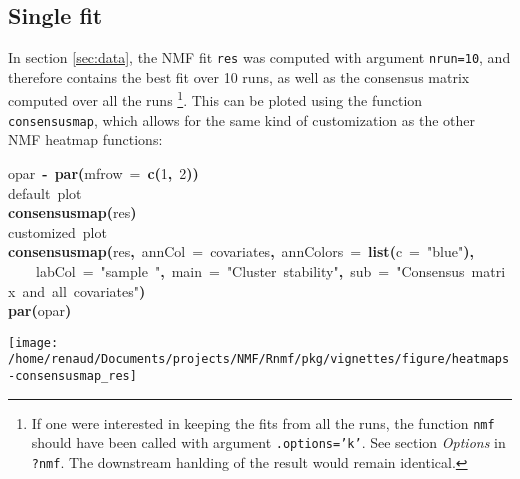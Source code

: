 \documentclass[a4paper]{article}\usepackage{graphicx, color}
\makeatletter
\def\maxwidth{ %
  \ifdim\Gin@nat@width>\linewidth
    \linewidth
  \else
    \Gin@nat@width
  \fi
}
\newcommand{\hlnumber}[1]{\textcolor[rgb]{0,0,0}{#1}}%
\newcommand{\hlfunctioncall}[1]{\textcolor[rgb]{0.501960784313725,0,0.329411764705882}{\textbf{#1}}}%
\newcommand{\hlstring}[1]{\textcolor[rgb]{0.6,0.6,1}{#1}}%
\newcommand{\hlkeyword}[1]{\textcolor[rgb]{0,0,0}{\textbf{#1}}}%
\newcommand{\hlargument}[1]{\textcolor[rgb]{0.690196078431373,0.250980392156863,0.0196078431372549}{#1}}%
\newcommand{\hlcomment}[1]{\textcolor[rgb]{0.180392156862745,0.6,0.341176470588235}{#1}}%
\newcommand{\hlassignement}[1]{\textcolor[rgb]{0,0,0}{\textbf{#1}}}%
\newcommand{\hlsymbol}[1]{\textcolor[rgb]{0,0,0}{#1}}%
\newcommand{\hlstd}[1]{\textcolor[rgb]{0,0,0}{#1}}%
\newenvironment{kframe}{%
 \def\FrameCommand##1{\hskip\@totalleftmargin \hskip-\fboxsep
 \colorbox{shadecolor}{##1}\hskip-\fboxsep
     \hskip-\linewidth \hskip-\@totalleftmargin \hskip\columnwidth}%
 \MakeFramed {\advance\hsize-\width
   \@totalleftmargin\z@ \linewidth\hsize
   \@setminipage}}%
 {\par\unskip\endMakeFramed}
\newenvironment{knitrout}{}{} %
\let\code=\texttt
\makeatother
\begin{document}
\subsection{Single fit}
In section \cref{sec:data}, the NMF fit \code{res} was computed with argument 
\code{nrun=10}, and therefore contains the best fit over 10 runs, as well as 
the consensus matrix computed over all the runs
\footnote{If one were interested in keeping the fits from all the runs, the 
function \code{nmf} should have been called with argument \code{.options='k'}.
See section \emph{Options} in \code{?nmf}.
The downstream hanlding of the result would remain identical.}.
This can be ploted using the function \code{consensusmap}, which allows for the 
same kind of customization as the other NMF heatmap functions:

\begin{knitrout}
\color{fgcolor}\begin{kframe}
\begin{flushleft}
\ttfamily\noindent
\hlsymbol{opar}{\ }\hlassignement{\usebox{\hlnormalsizeboxlessthan}-}{\ }\hlfunctioncall{par}\hlkeyword{(}\hlargument{mfrow}{\ }\hlargument{=}{\ }\hlfunctioncall{c}\hlkeyword{(}\hlnumber{1}\hlkeyword{,}{\ }\hlnumber{2}\hlkeyword{)}\hlkeyword{)}\hspace*{\fill}\\
\hlstd{}\hlcomment{\usebox{\hlnormalsizeboxhash}{\ }default{\ }plot}\hspace*{\fill}\\
\hlstd{}\hlfunctioncall{consensusmap}\hlkeyword{(}\hlsymbol{res}\hlkeyword{)}\hspace*{\fill}\\
\hlstd{}\hlcomment{\usebox{\hlnormalsizeboxhash}{\ }customized{\ }plot}\hspace*{\fill}\\
\hlstd{}\hlfunctioncall{consensusmap}\hlkeyword{(}\hlsymbol{res}\hlkeyword{,}{\ }\hlargument{annCol}{\ }\hlargument{=}{\ }\hlsymbol{covariates}\hlkeyword{,}{\ }\hlargument{annColors}{\ }\hlargument{=}{\ }\hlfunctioncall{list}\hlkeyword{(}\hlargument{c}{\ }\hlargument{=}{\ }\hlstring{"{}blue"{}}\hlkeyword{)}\hlkeyword{,}\hspace*{\fill}\\
\hlstd{}{\ }{\ }{\ }{\ }\hlargument{labCol}{\ }\hlargument{=}{\ }\hlstring{"{}sample{\ }"{}}\hlkeyword{,}{\ }\hlargument{main}{\ }\hlargument{=}{\ }\hlstring{"{}Cluster{\ }stability"{}}\hlkeyword{,}{\ }\hlargument{sub}{\ }\hlargument{=}{\ }\hlstring{"{}Consensus{\ }matrix{\ }and{\ }all{\ }covariates"{}}\hlkeyword{)}\hspace*{\fill}\\
\hlstd{}\hlfunctioncall{par}\hlkeyword{(}\hlsymbol{opar}\hlkeyword{)}\mbox{}
\normalfont
\end{flushleft}
\end{kframe}\texttt{[image: /home/renaud/Documents/projects/NMF/Rnmf/pkg/vignettes/figure/heatmaps-consensusmap\_res]} 
\end{knitrout}
\end{document}
